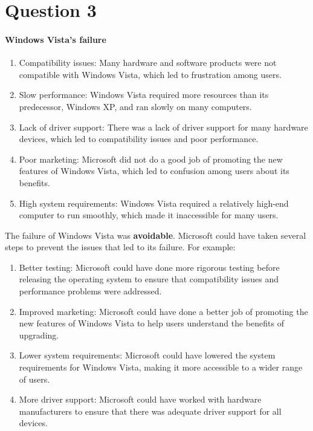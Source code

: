 \documentclass{article}
\begin{document}
\section{Question 3}%

\paragraph{Windows Vista's failure}
\begin{enumerate}



\item Compatibility issues: Many hardware and software products were not compatible with Windows Vista, which led to frustration among users.

\item Slow performance: Windows Vista required more resources than its predecessor, Windows XP, and ran slowly on many computers.

\item Lack of driver support: There was a lack of driver support for many hardware devices, which led to compatibility issues and poor performance.

\item Poor marketing: Microsoft did not do a good job of promoting the new features of Windows Vista, which led to confusion among users about its benefits.

\item High system requirements: Windows Vista required a relatively high-end computer to run smoothly, which made it inaccessible for many users.
\end{enumerate}

The failure of Windows Vista was \textbf{avoidable}. Microsoft could have taken several steps to prevent the issues that led to its failure. For example:


\begin{enumerate}

\item  Better testing: Microsoft could have done more rigorous testing before releasing the operating system to ensure that compatibility issues and performance problems were addressed.

\item  Improved marketing: Microsoft could have done a better job of promoting the new features of Windows Vista to help users understand the benefits of upgrading.

\item  Lower system requirements: Microsoft could have lowered the system requirements for Windows Vista, making it more accessible to a wider range of users.

\item More driver support: Microsoft could have worked with hardware manufacturers to ensure that there was adequate driver support for all devices.
\end{enumerate}
\end{document}
